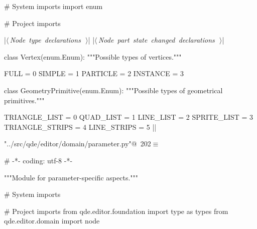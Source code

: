 \documentclass[%
    a4paper,    %
    justified,  %
    nobib,      %
    openany     %
]{tufte-book}
\makeatletter
\renewcommand{\label}[1]{\@tufte@label{##1}}%
\makeatother
\begin{document}
\begin{fullwidth}
\begin{flushleft}
\begin{minipage}{\linewidth}
\begin{pythoncode}
# System imports
import enum

# Project imports


|\hbox{$\langle\,${\itshape Node type declarations}\nobreak\ {\footnotesize {}}$\,\rangle$}|
|\hbox{$\langle\,${\itshape Node part state changed declarations}\nobreak\ {\footnotesize {}}$\,\rangle$}|


class Vertex(enum.Enum):
    """Possible types of vertices."""

    FULL     = 0
    SIMPLE   = 1
    PARTICLE = 2
    INSTANCE = 3


class GeometryPrimitive(enum.Enum):
    """Possible types of geometrical primitives."""

    TRIANGLE_LIST   = 0
    QUAD_LIST       = 1
    LINE_LIST       = 2
    SPRITE_LIST     = 3
    TRIANGLE_STRIPS = 4
    LINE_STRIPS     = 5
|\NWsep|
\end{pythoncode}
\vspace{1.5ex}
\footnotesize
\begin{list}{}{\setlength{\itemsep}{-\parsep}\setlength{\itemindent}{-\leftmargin}}

\item{}
\end{list}
\end{minipage}\vspace{4ex}
\end{flushleft}

\begin{flushleft} \small
\begin{minipage}{\linewidth}\label{scrap195}\raggedright\small
{} \verb@"../src/qde/editor/domain/parameter.py"@\nobreak\ {\footnotesize {202}}$\equiv$
\vspace{-1ex}
\begin{pythoncode}
# -*- coding: utf-8 -*-

"""Module for parameter-specific aspects."""

# System imports

# Project imports
from qde.editor.foundation import type as types
from qde.editor.domain import node


\end{pythoncode}
\end{minipage}
\end{flushleft}
\end{fullwidth}
\end{document}
